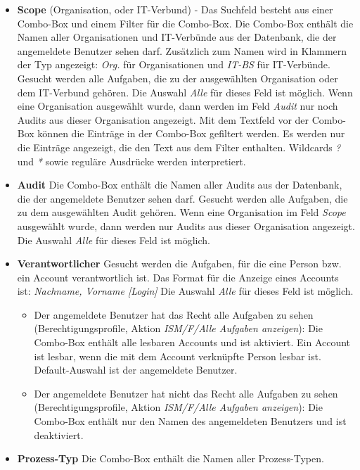 \documentclass[a4paper,10pt]{book}
\begin{document}
\begin{itemize}
 \item \textbf{Scope} (Organisation, oder IT-Verbund) - Das Suchfeld besteht aus
 einer Combo-Box und einem Filter für die Combo-Box. Die Combo-Box enthält die
 Namen aller Organisationen und IT-Verbünde aus der Datenbank, die der
 angemeldete Benutzer sehen darf. Zusätzlich zum Namen wird in Klammern der Typ
 angezeigt: \textit{Org.} für Organisationen und \textit{IT-BS} für IT-Verbünde.
 Gesucht werden alle Aufgaben, die zu der ausgewählten Organisation oder dem
 IT-Verbund gehören. Die Auswahl \textit{Alle} für dieses Feld ist möglich. Wenn
 eine Organisation ausgewählt wurde, dann werden im Feld \textit{Audit} nur noch
 Audits aus dieser Organisation angezeigt. Mit dem Textfeld vor der Combo-Box
 können die Einträge in der Combo-Box gefiltert werden. Es werden nur die
 Einträge angezeigt, die den Text aus dem Filter enthalten. Wildcards \textit{?}
 und \textit{*} sowie reguläre Ausdrücke werden interpretiert.
 \item \textbf{Audit} Die Combo-Box enthält die Namen aller Audits aus der
 Datenbank, die der angemeldete Benutzer sehen darf. Gesucht werden alle
 Aufgaben, die zu dem ausgewählten Audit gehören. Wenn eine Organisation im Feld
 \textit{Scope} ausgewählt wurde, dann werden nur Audits aus dieser Organisation
 angezeigt. Die Auswahl \textit{Alle} für dieses Feld ist möglich.
 \item \textbf{Verantwortlicher} Gesucht werden die Aufgaben, für die eine
 Person bzw. ein Account verantwortlich ist. Das Format für die Anzeige eines
 Accounts ist: \textit{Nachname, Vorname [Login]} Die Auswahl \textit{Alle} für
 dieses Feld ist möglich.
 \begin{itemize}
 \item Der angemeldete Benutzer hat das Recht alle Aufgaben zu sehen
 (Berechtigungsprofile, Aktion \textit{ISM/F/Alle Aufgaben anzeigen}): Die
 Combo-Box enthält alle lesbaren Accounts und ist aktiviert. Ein Account ist
 lesbar, wenn die mit dem Account verknüpfte Person lesbar ist. Default-Auswahl
 ist der angemeldete Benutzer.
 \item Der angemeldete Benutzer hat nicht das Recht alle Aufgaben zu sehen
 (Berechtigungsprofile, Aktion \textit{ISM/F/Alle Aufgaben anzeigen}): Die
 Combo-Box enthält nur den Namen des angemeldeten Benutzers und ist deaktiviert.
 \end{itemize}
 \item \textbf{Prozess-Typ} Die Combo-Box enthält die Namen aller Prozess-Typen.

\end{itemize}
\end{document}

